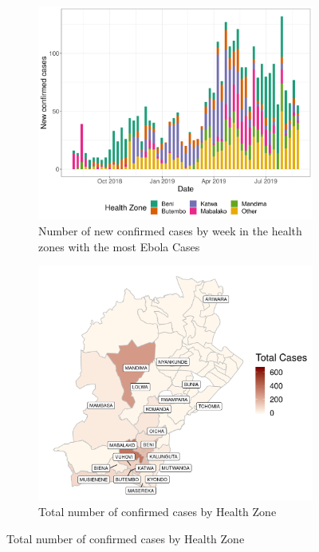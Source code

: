 \documentclass[12pt]{article}
\begin{document}
\begin{figure}[h!]
\begin{subfigure}{0.48\textwidth}
  \centering

  \includegraphics[width=\textwidth]{../output/epi_curve.png}
  \caption{Number of new confirmed cases by week in the health zones with the most Ebola Cases}
  \label{fig:epi_curve}
\end{subfigure}
\begin{subfigure}{0.48\textwidth}
  \centering
  \includegraphics[width=\textwidth]{../output/tot_map.png}
  \caption{Total number of confirmed cases by Health Zone}
  \label{fig:tot_map}
\end{subfigure}


\end{figure}
\end{document}
